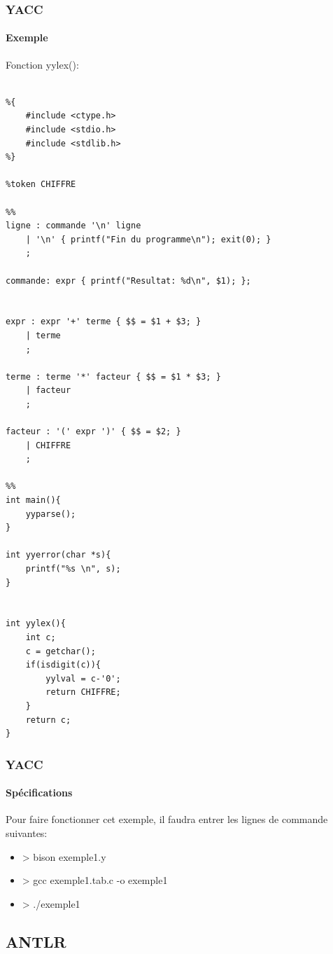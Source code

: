 \documentclass{beamer}
\begin{document}
\begin{frame}[fragile,allowframebreaks=0.98]\frametitle{YACC}\framesubtitle{Exemple}

Fonction yylex():

\begin{Verbatim}[fontsize=\scriptsize,frame=lines]

%{
    #include <ctype.h>
    #include <stdio.h>
    #include <stdlib.h>
%}

%token CHIFFRE

%%
ligne : commande '\n' ligne
    | '\n' { printf("Fin du programme\n"); exit(0); }
    ;

commande: expr { printf("Resultat: %d\n", $1); };


expr : expr '+' terme { $$ = $1 + $3; }
    | terme
    ;
   
terme : terme '*' facteur { $$ = $1 * $3; }
    | facteur
    ;
   
facteur : '(' expr ')' { $$ = $2; }
    | CHIFFRE
    ;

%%
int main(){
    yyparse();   
}

int yyerror(char *s){
    printf("%s \n", s);
}


int yylex(){
    int c;
    c = getchar();
    if(isdigit(c)){
        yylval = c-'0';
        return CHIFFRE;
    }
    return c;
}

\end{Verbatim}

\end{frame}

\begin{frame}\frametitle{YACC}\framesubtitle{Spécifications}

	Pour faire fonctionner cet exemple, il faudra entrer les lignes de commande suivantes:

	\begin{itemize}
				\item > bison exemple1.y\newline
				\item > gcc exemple1.tab.c -o exemple1\newline
				\item > ./exemple1\newline
	\end{itemize}

\end{frame}

\subsection{ANTLR}
\end{document}
